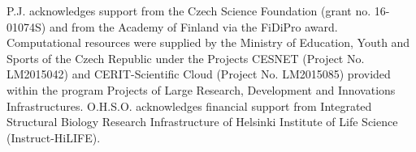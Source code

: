 \documentclass[journal=jpcbfk,manuscript=article]{achemso}
\begin{document}
 

\begin{acknowledgement} 
P.J. acknowledges support from the Czech Science Foundation (grant no. 16-01074S)  
and from the Academy of Finland via the FiDiPro award. 
Computational resources were supplied by the Ministry of Education, Youth and Sports 
of the Czech Republic under the Projects CESNET (Project No. LM2015042) and CERIT-Scientific 
Cloud (Project No. LM2015085) provided within the program Projects of Large Research, 
Development and Innovations Infrastructures. 
O.H.S.O. acknowledges financial support from 
Integrated Structural Biology Research Infrastructure of 
Helsinki Institute of Life Science (Instruct-HiLIFE). 
\end{acknowledgement} 
 
\begin{suppinfo} 
 
 
 
\end{suppinfo} 
 
 
 
 
\end{document}
